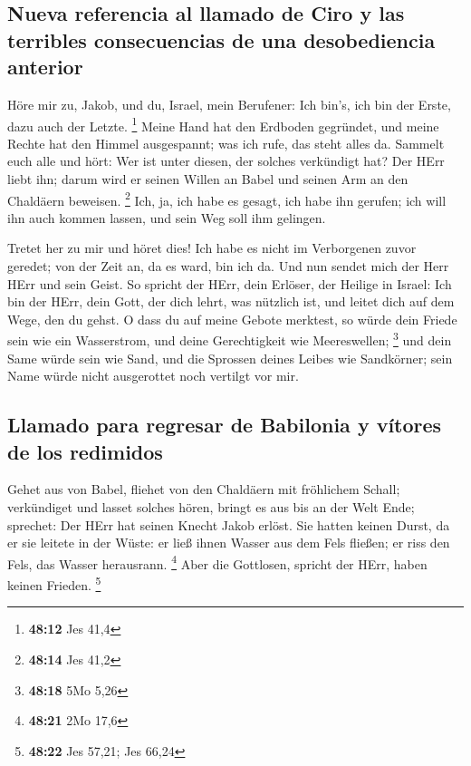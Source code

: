 \hypertarget{nueva-referencia-al-llamado-de-ciro-y-las-terribles-consecuencias-de-una-desobediencia-anterior}{%
\subsection{Nueva referencia al llamado de Ciro y las terribles
consecuencias de una desobediencia
anterior}\label{nueva-referencia-al-llamado-de-ciro-y-las-terribles-consecuencias-de-una-desobediencia-anterior}}

 Höre mir zu, Jakob, und du, Israel, mein Berufener: Ich
bin's, ich bin der Erste, dazu auch der Letzte. \footnote{\textbf{48:12}
  Jes 41,4}  Meine Hand hat den Erdboden gegründet, und
meine Rechte hat den Himmel ausgespannt; was ich rufe, das steht alles
da.  Sammelt euch alle und hört: Wer ist unter diesen,
der solches verkündigt hat? Der HErr liebt ihn; darum wird er seinen
Willen an Babel und seinen Arm an den Chaldäern beweisen. \footnote{\textbf{48:14}
  Jes 41,2}  Ich, ja, ich habe es gesagt, ich habe ihn
gerufen; ich will ihn auch kommen lassen, und sein Weg soll ihm
gelingen.

 Tretet her zu mir und höret dies! Ich habe es nicht im
Verborgenen zuvor geredet; von der Zeit an, da es ward, bin ich da. Und
nun sendet mich der Herr HErr und sein Geist.  So spricht
der HErr, dein Erlöser, der Heilige in Israel: Ich bin der HErr, dein
Gott, der dich lehrt, was nützlich ist, und leitet dich auf dem Wege,
den du gehst.  O dass du auf meine Gebote merktest, so
würde dein Friede sein wie ein Wasserstrom, und deine Gerechtigkeit wie
Meereswellen; \footnote{\textbf{48:18} 5Mo 5,26}  und
dein Same würde sein wie Sand, und die Sprossen deines Leibes wie
Sandkörner; sein Name würde nicht ausgerottet noch vertilgt vor mir.

\hypertarget{llamado-para-regresar-de-babilonia-y-vuxedtores-de-los-redimidos}{%
\subsection{Llamado para regresar de Babilonia y vítores de los
redimidos}\label{llamado-para-regresar-de-babilonia-y-vuxedtores-de-los-redimidos}}

 Gehet aus von Babel, fliehet von den Chaldäern mit
fröhlichem Schall; verkündiget und lasset solches hören, bringt es aus
bis an der Welt Ende; sprechet: Der HErr hat seinen Knecht Jakob erlöst.
 Sie hatten keinen Durst, da er sie leitete in der Wüste:
er ließ ihnen Wasser aus dem Fels fließen; er riss den Fels, das Wasser
herausrann. \footnote{\textbf{48:21} 2Mo 17,6}  Aber die
Gottlosen, spricht der HErr, haben keinen Frieden. \footnote{\textbf{48:22}
  Jes 57,21; Jes 66,24}

